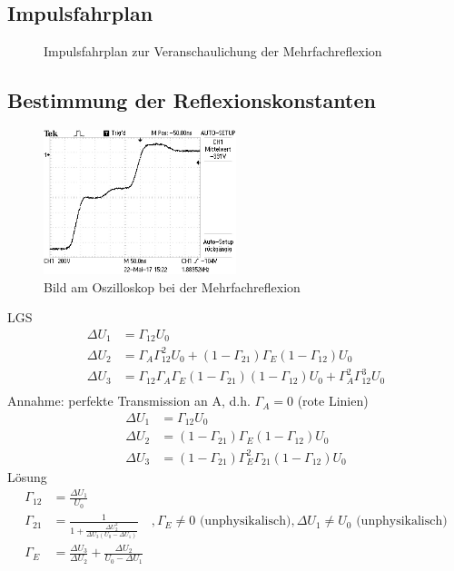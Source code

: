 \subsection{Impulsfahrplan}
\begin{figure}[h]
	\centering
	
	\caption[Impulsfahrplan]{Impulsfahrplan zur Veranschaulichung der Mehrfachreflexion}
	\label{fig:Impulsfahrplan}
\end{figure}
\subsection{Bestimmung der Reflexionskonstanten}
\begin{figure}[h]
	\centering
	\includegraphics[width=0.5\textwidth]{Oszilloskop/Mehrfachreflexion/F0054TEK.JPG}
	\caption[Mehrfachreflexion]{Bild am Oszilloskop bei der Mehrfachreflexion}
	\label{fig:Mehrfachreflexion}
\end{figure}
LGS
\begin{align}
	\Delta U_1 &= \Gamma_{12}U_0 \\
	\Delta U_2 &= \Gamma_A\Gamma_{12}^2U_0 + (1-\Gamma_{21})\Gamma_E(1-\Gamma_{12})U_0 \\
	\Delta U_3 &= \Gamma_{12}\Gamma_A\Gamma_E(1-\Gamma_{21})(1-\Gamma_{12})U_0 + \Gamma_A^2\Gamma_{12}^3U_0 \\
\end{align}
Annahme: perfekte Transmission an A, d.h. $\Gamma_A=0$ (rote Linien)
\begin{align}
	\Delta U_1 &= \Gamma_{12}U_0 \\
	\Delta U_2 &= (1-\Gamma_{21})\Gamma_E(1-\Gamma_{12})U_0 \\
	\Delta U_3 &= (1-\Gamma_{21})\Gamma_E^2\Gamma_{21}(1-\Gamma_{12})U_0
\end{align}
Lösung
\begin{align}
	\Gamma_{12} &= \frac{\Delta U_1}{U_0} \\
	\Gamma_{21} &= \frac{1}{1+\frac{\Delta U_2^2}{\Delta U_3(U_0-\Delta U_1)}} \quad, \Gamma_E \not= 0\text{ (unphysikalisch)}, \Delta U_1 \not= U_0\text{ (unphysikalisch)} \\
	\Gamma_E &= \frac{\Delta U_3}{\Delta U_2} + \frac{\Delta U_2}{U_0-\Delta U_1}
\end{align}
